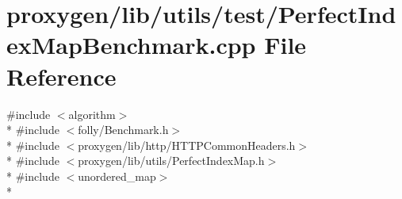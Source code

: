 \section{proxygen/lib/utils/test/\+Perfect\+Index\+Map\+Benchmark.cpp File Reference}
\label{PerfectIndexMapBenchmark_8cpp}
{\ttfamily \#include $<$algorithm$>$}\\*
{\ttfamily \#include $<$folly/\+Benchmark.\+h$>$}\\*
{\ttfamily \#include $<$proxygen/lib/http/\+H\+T\+T\+P\+Common\+Headers.\+h$>$}\\*
{\ttfamily \#include $<$proxygen/lib/utils/\+Perfect\+Index\+Map.\+h$>$}\\*
{\ttfamily \#include $<$unordered\+\_\+map$>$}\\*
